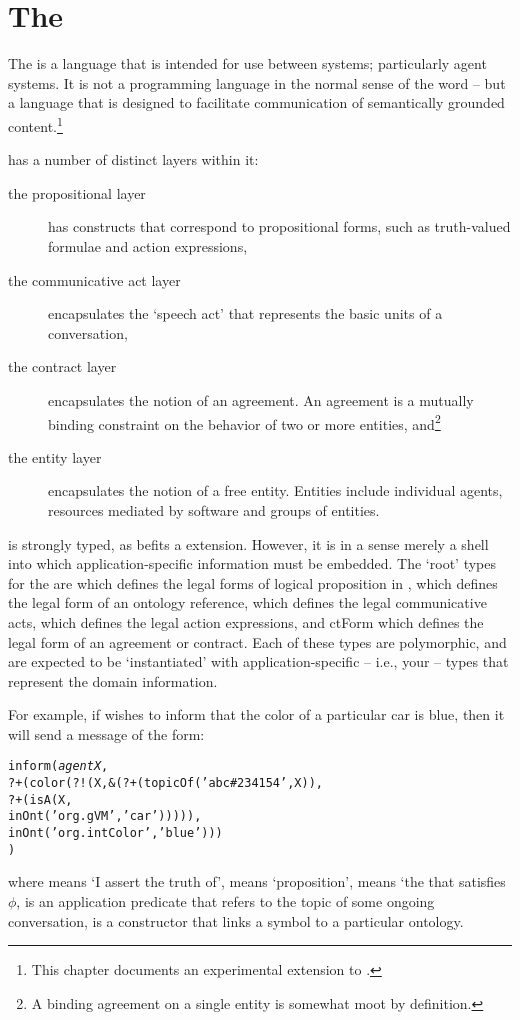 \chapter{The \gcl}
\label{gcl}

The \gcl is a language that is intended for use between \go systems; particularly agent systems. It is not a programming language in the normal sense of the word -- but a language that is designed to facilitate communication of semantically grounded content.\footnote{This chapter documents an experimental extension to \go.}

\gcl has a number of distinct layers within it:
\begin{description}
\item[the propositional layer] has constructs that correspond to propositional forms, such as truth-valued formulae and action expressions,
\item[the communicative act layer] encapsulates the `speech act' that represents the basic units of a conversation,
\item[the contract layer] encapsulates the notion of an agreement. An agreement is a mutually binding constraint on the behavior of two or more entities, and\footnote{A binding agreement on a single entity is somewhat moot by definition.}
\item[the entity layer] encapsulates the notion of a free entity. Entities include individual agents, resources mediated by software and groups of entities.
\end{description}

\gcl is strongly typed, as befits a \go extension. However, it is in a sense merely a shell into which application-specific information must be embedded. The `root' types for the \gcl are  which defines the legal forms of logical proposition in \gcl,  which defines the legal form of an ontology reference,  which defines the legal communicative acts,  which defines the legal action expressions, and ctForm which defines the legal form of an agreement or contract. Each of these types are polymorphic, and are expected to be `instantiated' with application-specific -- i.e., your -- types that represent the domain information.



For example, if  wishes to inform  that the color of a particular car is blue, then it will send a message of the form:
\begin{alltt}
inform(\emph{agentX},
   ?+(color(?!(X,&(?+(topicOf('abc\#234154',X)),
                  ?+(isA(X,
                      inOnt('org.gVM','car'))))),
            inOnt('org.intColor','blue')))
)
\end{alltt}
where  means `I assert the truth of',  means `proposition',  means `the  that satisfies $\phi$,  is an application predicate that refers to the  topic of some ongoing conversation,  is a constructor that links a symbol to a particular ontology.

